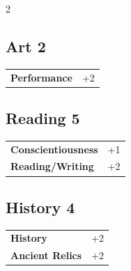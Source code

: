 \begin{multicols}{2}
\begin{tcolorbox}
    \subsection*{Art \hfill \small{2 }}
    \tcblower




\begin{tabular}{@{}ll@{}}
    \textbf{Performance} & +2\\
\end{tabular}


\end{tcolorbox}

\begin{tcolorbox}
    \subsection*{Reading \hfill \small{5 }}
    \tcblower




\begin{tabular}{@{}ll@{}}
    \textbf{Conscientiousness} & +1\\
    \textbf{Reading/Writing} & +2\\
\end{tabular}


\end{tcolorbox}

\begin{tcolorbox}
    \subsection*{History \hfill \small{4 }}
    \tcblower




\begin{tabular}{@{}ll@{}}
    \textbf{History} & +2\\
    \textbf{Ancient Relics} & +2\\
\end{tabular}



\end{tcolorbox}
\end{multicols}
